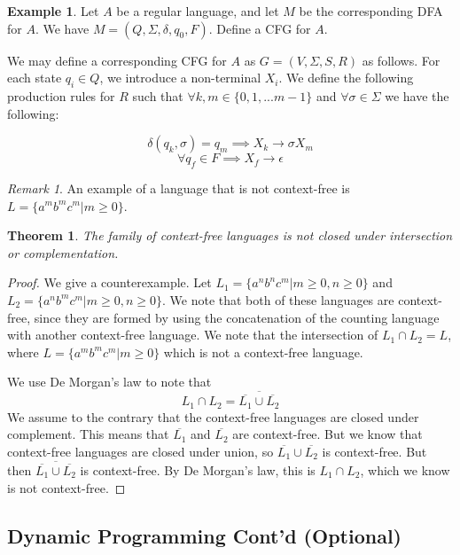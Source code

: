 \documentclass[11pt]{article}
\theoremstyle{plain} %
\newtheorem*{theorem}{Theorem}
\theoremstyle{definition}
\theoremstyle{example}
\newtheorem*{example}{Example}
\theoremstyle{remark}
\newtheorem*{remark}{Remark}
\begin{document}
\begin{example}Let $A$ be a regular language, and let $M$ be the corresponding DFA for $A$. We have $M = (Q, \Sigma, \delta, q_0, F)$. Define a CFG for $A$.
\end{example}

We may define a corresponding CFG for $A$ as $G = (V, \Sigma, S, R)$ as follows. For each state $q_i \in Q$, we introduce a non-terminal $X_i$. We define the following production rules for $R$ such that $\forall k,m \in \{0,1,...m-1\}$ and $\forall \sigma \in \Sigma$ we have the following:

$$\delta(q_k, \sigma) = q_m \implies	X_k \rightarrow \sigma X_m$$
$$\forall q_f \in F \implies X_f \rightarrow \epsilon$$

\begin{remark}
An example of a language that is not context-free is $L= \{a^mb^mc^m | m \geq 0 \}$.
\end{remark}

\begin{theorem}
The family of context-free languages is not closed under intersection or complementation.
\end{theorem}

\begin{proof}
We give a counterexample. Let $L_1 = \{a^nb^nc^m | m\geq 0, n \geq 0\}$ and $L_2 = \{a^nb^mc^m | m\geq 0, n \geq 0\}$. We note that both of these languages are context-free, since they are formed by using the concatenation of the counting language with another context-free language. We note that the intersection of $L_1 \cap L_2 = L$, where $L = \{a^mb^mc^m | m \geq 0\}$ which is not a context-free language. 

We use De Morgan's law to note that $$L_1 \cap L_2 = \overline{\overline{L_1} \cup \overline{L_2}}$$ We assume to the contrary that the context-free languages are closed under complement. This means that $\overline{L_1}$ and $\overline{L_2}$ are context-free. But we know that context-free languages are closed under union, so $\overline{L_1} \cup \overline{L_2}$ is context-free. But then $\overline{\overline{L_1} \cup \overline{L_2}}$ is context-free. By De Morgan's law, this is $L_1 \cap L_2$, which we know is not context-free.

\end{proof}


\subsection{Dynamic Programming Cont'd (Optional)}
\end{document}
